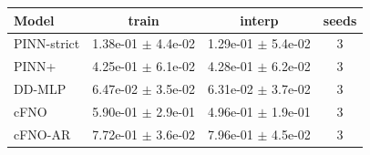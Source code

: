 \begin{tabular}{lccc}
\toprule
Model & train & interp & seeds \\
\midrule
PINN-strict & 1.38e-01 $\pm$ 4.4e-02 & 1.29e-01 $\pm$ 5.4e-02 & 3 \\
PINN+ & 4.25e-01 $\pm$ 6.1e-02 & 4.28e-01 $\pm$ 6.2e-02 & 3 \\
DD-MLP & 6.47e-02 $\pm$ 3.5e-02 & 6.31e-02 $\pm$ 3.7e-02 & 3 \\
cFNO & 5.90e-01 $\pm$ 2.9e-01 & 4.96e-01 $\pm$ 1.9e-01 & 3 \\
cFNO-AR & 7.72e-01 $\pm$ 3.6e-02 & 7.96e-01 $\pm$ 4.5e-02 & 3 \\
\bottomrule
\end{tabular}
